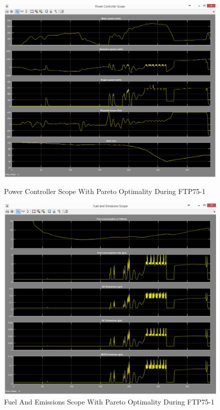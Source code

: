 \begin{figure}[hp]
\centering
\includegraphics[scale=0.46]{figures/Pareto/FTP75-1/powerController30Juni}
\caption{Power Controller Scope With Pareto Optimality During FTP75-1}
\label{fig:pcpo1}
\includegraphics[scale=0.49]{figures/Pareto/FTP75-1/fuelEmissions30Juni}
\caption{Fuel And Emissions Scope With Pareto Optimality During FTP75-1}
\label{fig:fepo1}
\end{figure}


